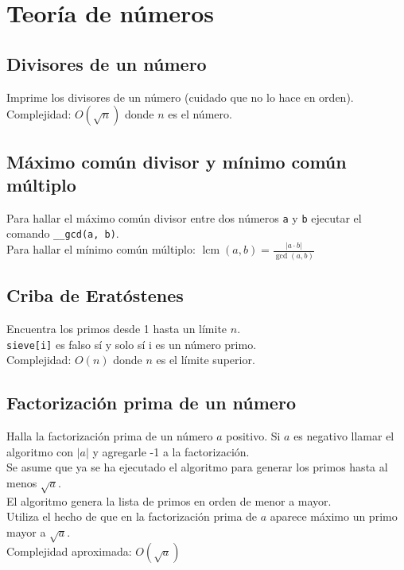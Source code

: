 \documentclass[10pt,letterpaper,twocolumn]{article}
\newcommand{\source}[1]{
	
	\dotfill
}
\begin{document}
\section{Teoría de números}
	\subsection{Divisores de un número}
	Imprime los divisores de un número (cuidado que no lo hace en orden).\\
	Complejidad: $O(\sqrt{n})$ donde $n$ es el número.\\
	\source{./src/divisors.cpp}
	
	\subsection{Máximo común divisor y mínimo común múltiplo}
	Para hallar el máximo común divisor entre dos números \verb|a| y \verb|b| ejecutar el comando \verb|__gcd(a, b)|.\\
	Para hallar el mínimo común múltiplo: \quad $ \displaystyle\operatorname{lcm}(a, b) = \frac{|a \cdot b|}{\operatorname{gcd}(a,b)}$
	
	\subsection{Criba de Eratóstenes}
	Encuentra los primos desde 1 hasta un límite $n$.\\
	\verb|sieve[i]| es falso sí y solo sí i es un número primo.\\
	Complejidad: $O(n)$ donde $n$ es el límite superior.\\
	\source{./src/sieve.cpp}
	
	\subsection{Factorización prima de un número}
	Halla la factorización prima de un número $a$ positivo. Si $a$ es negativo llamar el algoritmo con $|a|$ y agregarle -1 a la factorización.\\
	Se asume que ya se ha ejecutado el algoritmo para generar los primos hasta al menos $\sqrt{a}$.\\
	El algoritmo genera la lista de primos en orden de menor a mayor.\\
	Utiliza el hecho de que en la factorización prima de $a$ aparece máximo un primo mayor a $\sqrt{a}$.\\
	Complejidad aproximada: $O(\sqrt{a})$\\
	\source{./src/factorization.cpp}
	
\end{document}
